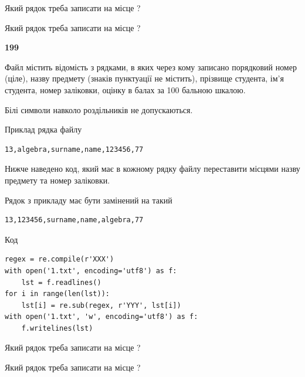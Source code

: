 Який рядок треба записати на місце  ?\par
\vspace{5mm}


Який рядок треба записати на місце  ?\par


\newpage

{\begin {center}\textbf{ 199}\end {center}}\par
Файл  містить відомість з рядками, в яких через кому записано поряд\-ковий номер (ціле), назву предмету (знаків пунктуації не містить), прізвище студента, ім'я студента, номер заліковки, оцінку в балах за 100 бальною шкалою.

Білі символи навколо роздільників не допускаються.

Приклад рядка файлу



\begin{verbatim}
13,algebra,surname,name,123456,77
\end{verbatim}


Нижче наведено код, який має в кожному рядку файлу переставити місцями назву предмету та номер заліковки.

Рядок з прикладу має бути замінений на такий



\begin{verbatim}
13,123456,surname,name,algebra,77
\end{verbatim}




Код



\begin{verbatim}
regex = re.compile(r'XXX')
with open('1.txt', encoding='utf8') as f:
    lst = f.readlines()
for i in range(len(lst)):
    lst[i] = re.sub(regex, r'YYY', lst[i])
with open('1.txt', 'w', encoding='utf8') as f:
    f.writelines(lst)
\end{verbatim}







Який рядок треба записати на місце  ?\par
\vspace{5mm}


Який рядок треба записати на місце  ?\par


